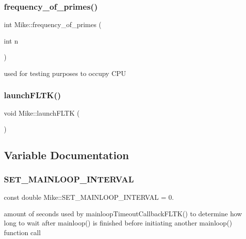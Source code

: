 \subsubsection{\texorpdfstring{frequency\+\_\+of\+\_\+primes()}{frequency\_of\_primes()}}
{\footnotesize\ttfamily int Mike\+::frequency\+\_\+of\+\_\+primes (\begin{DoxyParamCaption}\item[{int}]{n }\end{DoxyParamCaption})}

used for testing purposes to occupy C\+PU \mbox{\label{namespace_mike_a11de29a6b789ad768bf74759d81c1957}} 
\subsubsection{\texorpdfstring{launch\+F\+L\+T\+K()}{launchFLTK()}}
{\footnotesize\ttfamily void Mike\+::launch\+F\+L\+TK (\begin{DoxyParamCaption}{ }\end{DoxyParamCaption})}



\subsection{Variable Documentation}
\mbox{\label{namespace_mike_abbeda217f93388b7dd036c32d183f426}} 
\subsubsection{\texorpdfstring{S\+E\+T\+\_\+\+M\+A\+I\+N\+L\+O\+O\+P\+\_\+\+I\+N\+T\+E\+R\+V\+AL}{SET\_MAINLOOP\_INTERVAL}}
{\footnotesize\ttfamily const double Mike\+::\+S\+E\+T\+\_\+\+M\+A\+I\+N\+L\+O\+O\+P\+\_\+\+I\+N\+T\+E\+R\+V\+AL = 0.\hspace{0.3cm}{\ttfamily [static]}}

amount of seconds used by mainloop\+Timeout\+Callback\+F\+L\+T\+K() to determine how long to wait after mainloop() is finished before initiating another mainloop() function call 